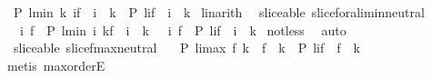 \begin{isabellebody}
\ \ {\isachardoublequoteopen}{\isacharparenleft}P\ {\isacharparenleft}l{\isasymdagger}{\isacharparenleft}min\ k\ i{\isacharparenright}{\isachardot}{\isachardot}f{\isacharparenright}\ {\isasymand}\ i\ {\isacharless}\ k{\isacharparenright}\ {\isasymlongleftrightarrow}\ {\isacharparenleft}P\ {\isacharparenleft}l{\isasymdagger}i{\isachardot}{\isachardot}f{\isacharparenright}\ {\isasymand}\ i\ {\isacharless}\ k{\isacharparenright}{\isachardoublequoteclose}\isanewline
%
\isadelimproof
%
\endisadelimproof
%
\isatagproof
{}\isamarkupfalse%
\ linarith%
\endisatagproof
{\isafoldproof}%
%
\isadelimproof
\isanewline
%
\endisadelimproof
\isanewline
{}\isamarkupfalse%
\ {\isacharparenleft}\ sliceable{\isacharparenright}\ slice{\isacharunderscore}foral{\isacharunderscore}i{\isacharunderscore}min{\isacharunderscore}neutral{\isacharcolon}\ \isanewline
\ \ {\isachardoublequoteopen}{\isacharparenleft}{\isasymforall}\ i\ f\ {\isachardot}\ P\ {\isacharparenleft}l{\isasymdagger}{\isacharparenleft}min\ i\ k{\isacharparenright}{\isachardot}{\isachardot}f{\isacharparenright}\ {\isasymand}\ i\ {\isasymle}\ k{\isacharparenright}\ {\isasymlongleftrightarrow}\ {\isacharparenleft}{\isasymforall}\ i\ f\ {\isachardot}\ P\ {\isacharparenleft}l{\isasymdagger}i{\isachardot}{\isachardot}f{\isacharparenright}\ {\isasymand}\ i\ {\isasymle}\ k{\isacharparenright}{\isachardoublequoteclose}\isanewline
%
\isadelimproof
%
\endisadelimproof
%
\isatagproof
{}\isamarkupfalse%
\ not{\isacharunderscore}less\ \isamarkupfalse%
\ auto%
\endisatagproof
{\isafoldproof}%
%
\isadelimproof
\isanewline
%
\endisadelimproof
\isanewline
{}\isamarkupfalse%
\ {\isacharparenleft}\ sliceable{\isacharparenright}\ slice{\isacharunderscore}f{\isacharunderscore}max{\isacharunderscore}neutral{\isacharcolon}\ \isanewline
\ \ {\isachardoublequoteopen}{\isacharparenleft}P\ {\isacharparenleft}l{\isasymdagger}i{\isachardot}{\isachardot}{\isacharparenleft}max\ f\ k{\isacharparenright}{\isacharparenright}\ {\isasymand}\ f\ {\isasymge}\ k{\isacharparenright}\ {\isasymlongleftrightarrow}\ {\isacharparenleft}P\ {\isacharparenleft}l{\isasymdagger}i{\isachardot}{\isachardot}f{\isacharparenright}\ {\isasymand}\ f\ {\isasymge}\ k{\isacharparenright}{\isachardoublequoteclose}\isanewline
%
\isadelimproof
%
\endisadelimproof
%
\isatagproof
{}\isamarkupfalse%
\ {\isacharparenleft}metis\ max{\isachardot}orderE{\isacharparenright}%
\endisatagproof
{\isafoldproof}%
%
\isadelimproof
\isanewline
%
\endisadelimproof
\isanewline

\end{isabellebody}
